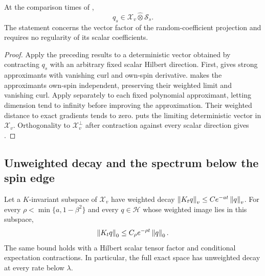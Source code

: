 \begin{proposition}
\label{prop:exact-closedness}
At the comparison times of ,
\begin{equation}\label{eq:exact-closedness}
 q_s\in\mathcal X_v\mathbin{\widehat\otimes}\mathcal S_s.
\end{equation}
The statement concerns the vector factor of the random-coefficient
projection and requires no regularity of its scalar coefficients.
\end{proposition}

\begin{proof}
Apply the preceding results to a deterministic vector obtained by
contracting $q_s$ with an arbitrary fixed scalar Hilbert direction.
First,  gives strong approximants with
vanishing curl and own-spin derivative.   makes the approximants own-spin independent,
preserving their weighted limit and vanishing curl.  Apply
 separately to each fixed polynomial approximant,
letting dimension tend to infinity before improving the approximation.
Their weighted distance to exact gradients tends to zero.
 puts the limiting deterministic vector in
$\mathcal X_v$.  Orthogonality to $\mathcal X_v^\perp$ after contraction
against every scalar direction gives .
\end{proof}

\subsection{Unweighted decay and the spectrum below the spin edge}

\begin{lemma}
\label{lem:exact-upgrade}
Let a $K$-invariant subspace of $\mathcal X_v$ have weighted decay
$\left\lVert K_tq\right\rVert_v\le C e^{-at}\left\lVert q\right\rVert_v$.  For every
$\rho<\min\{a,1-\beta^2\}$ and every $q\in\mathcal H$ whose weighted
image lies in this subspace,
\begin{equation}\label{eq:exact-unweighted-decay}
 \left\lVert K_tq\right\rVert_0\le C_\rho e^{-\rho t}\left\lVert q\right\rVert_0.
\end{equation}
The same bound holds with a Hilbert scalar tensor factor and conditional
expectation contractions.  In particular, the full exact space has
unweighted decay at every rate below $\lambda$.
\end{lemma}

